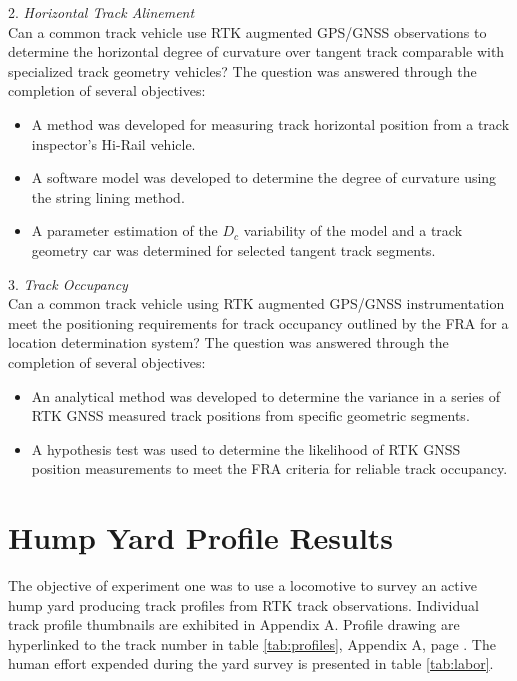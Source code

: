 2. \emph{Horizontal Track Alinement}\\
Can a common track vehicle use RTK augmented GPS/GNSS observations to determine the horizontal degree of curvature over tangent track comparable with specialized track geometry vehicles?
The question was answered through the completion of several objectives:
\begin{itemize}
\item A method was developed for measuring track horizontal position from a track inspector's Hi-Rail vehicle.
\item A software model was developed to determine the degree of curvature using the string lining method.
\item A parameter estimation of the ${D_c}$ variability of the model and a track geometry car was determined for selected tangent track segments.
\end{itemize}

3. \emph{Track Occupancy}\\
Can a common track vehicle using RTK augmented GPS/GNSS instrumentation meet the positioning requirements for track occupancy outlined by the FRA for a location determination system?
The question was answered through the completion of several objectives:
\begin{itemize}
\item An analytical method was developed to determine the variance in a series of RTK GNSS measured track positions from specific geometric segments.
\item A hypothesis test was used to determine the likelihood of RTK GNSS position measurements to meet the FRA criteria for reliable track occupancy.
\end{itemize}

\section{Hump Yard Profile Results}
The objective of experiment one was to use a locomotive to survey an active hump yard producing track profiles from RTK track observations. Individual track profile thumbnails are exhibited in Appendix A. Profile drawing are hyperlinked to the track number in table \ref{tab:profiles}, Appendix A, page \pageref{tab:profiles}. The human effort expended during the yard survey is presented in table \ref{tab:labor}.

